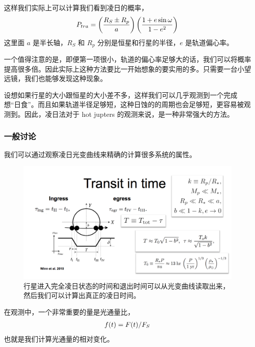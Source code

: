 \documentclass[letterpaper,10pt,english]{sphinxmanual}
\begin{document}
这样我们实际上可以计算我们看到凌日的概率，
\begin{gather}
\begin{split}P_{tra}= \left(\frac{R_{S}\pm R_p}{a}\right) \left( \frac{1+e \sin\omega}{1-e^2} \right)\end{split}\notag
\end{gather}
这里面 \(a\) 是半长轴，\(R_{S}\) 和 \(R_p\) 分别是恒星和行星的半径，\(e\) 是轨道偏心率。

一个值得注意的是，即便第一项很小，轨道的偏心率足够大的话，我们可以将概率提高很多倍。因此实际上这种方法要比一开始想象的要实用的多。只需要一台小望远镜，我们也能够发现这种现象。

设想如果行星的大小跟恒星的大小差不多，这样我们可以几乎观测到一个完成想“日食”。而且如果轨道半径足够短，这种日蚀的的周期也会足够短，更容易被观测到。因此，凌日法对于 hot jupters 的观测来说，是一种非常强大的方法。


\subsubsection{一般讨论}
\label{detection:id8}
我们可以通过观察凌日光变曲线来精确的计算很多系统的属性。
\begin{figure}[htbp]
\centering
\capstart

\includegraphics{transitInTime.png}
\caption{行星进入完全凌日状态的时间和退出时间可以从光变曲线读取出来，然后我们可以计算出真正的凌日时间。}\end{figure}

在观测中，一个非常重要的量是光通量比，
\begin{gather}
\begin{split}f(t) = F(t)/F_S\end{split}\notag
\end{gather}
也就是我们计算光通量的相对变化。
\end{document}
